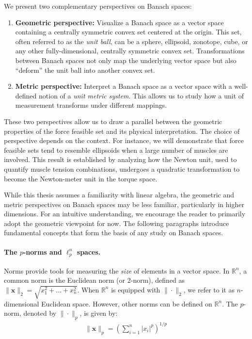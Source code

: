 We present two complementary perspectives on Banach spaces:

\begin{enumerate}
  \item{ \textbf{Geometric perspective:} Visualize a Banach space as a vector space containing a centrally symmetric convex set centered at the origin. This set, often referred to as the \emph{unit ball}, can be a sphere, ellipsoid, zonotope, cube, or any other fully-dimensional, centrally symmetric convex set.  Transformations between Banach spaces not only map the underlying vector space but also ``deform'' the unit ball into another convex set.}
  \item{ \textbf{Metric perspective:}  Interpret a Banach space as a vector space with a well-defined notion of a \emph{unit metric system}. This allows us to study how a unit of measurement transforms under different mappings.}
\end{enumerate}

These two perspectives allow us to draw a parallel between the geometric properties of the force feasible set and its physical interpretation. The choice of perspective depends on the context. For instance, we will demonstrate that force feasible sets tend to resemble ellipsoids when a large number of muscles are involved. This result is established by analyzing how the Newton unit, used to quantify muscle tension combinations, undergoes a quadratic transformation to become the Newton-meter unit in the torque space.

While this thesis assumes a familiarity with linear algebra, the geometric and metric perspectives on Banach spaces may be less familiar, particularly in higher dimensions. For an intuitive understanding, we encourage the reader to primarily adopt the geometric viewpoint for now. The following paragraphs introduce fundamental concepts that form the basis of any study on Banach spaces.

\paragraph*{The $p$-norms and $\ell_p^n$ spaces.} Norms provide tools for measuring the \emph{size} of elements in a vector space. In $\mathbb{R}^n$, a common norm is the Euclidean norm (or 2-norm), defined as $\|\mathbf{x}\|_2 = \sqrt{x_1^2 + \dots + x_n^2}$. When $\mathbb{R}^n$ is equipped with $\|\cdot \|_2$, we refer to it as $n$-dimensional Euclidean space. However, other norms can be defined on $\mathbb{R}^n$.  The $p$-norm, denoted by $\|\cdot \|_p$, is given by:
\begin{align*}
\|\mathbf{x}\|_p = \left(\sum_{i=1}^n \vert x_i \vert^{p}\right)^{1/p}
\end{align*}

